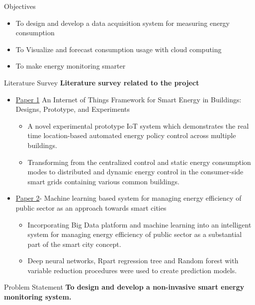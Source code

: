 \documentclass[11pt, aspect ratio=169]{beamer}
\begin{document}
\begin{frame}{Objectives}
\begin{itemize}
	\item To design and develop a data acquisition system for measuring energy consumption
	\item To Visualize and forecast consumption usage with cloud computing
	\item To make energy monitoring smarter
\end{itemize}
\end{frame}


\begin{frame}{Literature Survey}
\textbf{Literature survey related to the project}
\begin{itemize}
	\item \underline{Paper 1} An Internet of Things Framework for Smart Energy in Buildings: Designs, Prototype, and Experiments
	\begin{itemize}
		\item A novel experimental prototype IoT system which demonstrates the real time location-based automated energy policy control across multiple buildings.
        \item Transforming from the centralized control and static energy consumption modes to distributed and dynamic energy control in the consumer-side smart grids containing various common buildings.
	\end{itemize}
	\item \underline{Paper 2}- Machine learning based system for managing energy efficiency of public sector as an approach towards smart cities
	\begin{itemize}
		\item Incorporating Big Data platform and machine learning into an intelligent system for managing energy efficiency of public sector as a substantial part of the smart city concept.
		\item Deep neural networks, Rpart regression tree and Random forest with variable reduction procedures were used to create prediction models.
	\end{itemize}
\end{itemize}
\end{frame}



\begin{frame}{Problem Statement}
\centering
\textbf{To design and develop a non-invasive smart energy monitoring system.}
\end{frame}
\end{document}

